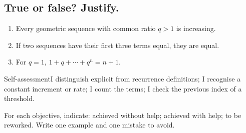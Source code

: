 \subsection*{True or false? Justify.}\label{C01-VF}
\begin{enumerate}
\item Every geometric sequence with common ratio $q>1$ is increasing.
\item If two sequences have their first three terms equal, they are equal.
\item For $q=1$, $1+q+\cdots+q^n=n+1$.
\end{enumerate}
\begin{repere}{Self-assessment}I distinguish explicit from recurrence definitions; I recognise a constant increment or rate; I count the terms; I check the previous index of a threshold.

For each objective, indicate: achieved without help; achieved with help; to be reworked. Write one example and one mistake to avoid.\end{repere}
\endgroup
\ifprof\fi
